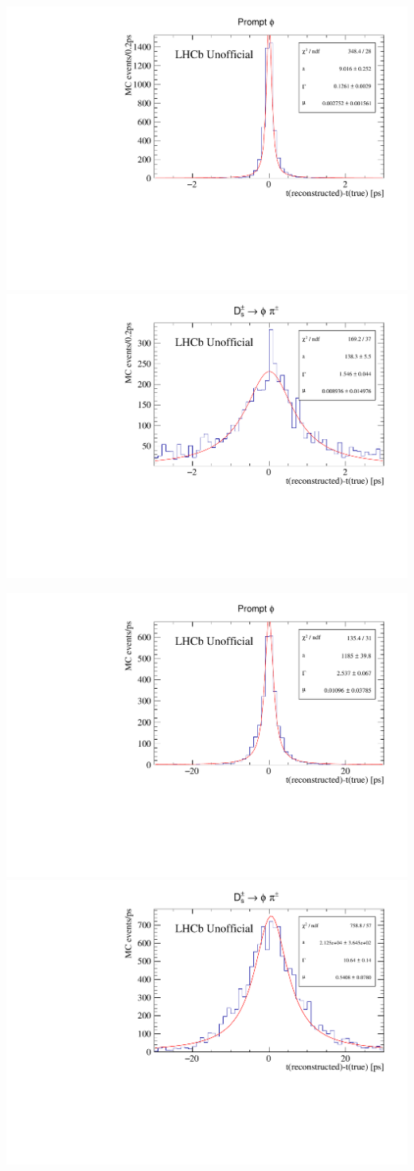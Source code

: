 \begin{center}
\includegraphics[width=.49\textwidth]{figs/time_res_incl/timeResolution-LL.pdf}
\includegraphics[width=.49\textwidth]{figs/time_res_Ds/timeResolution-LL.pdf}
\label{FIG:LL-res}


\includegraphics[width=.49\textwidth]{figs/time_res_incl/timeResolution-DD.pdf}
\includegraphics[width=.49\textwidth]{figs/time_res_Ds/timeResolution-DD.pdf}
\label{FIG:DD-res}
\end{center}

